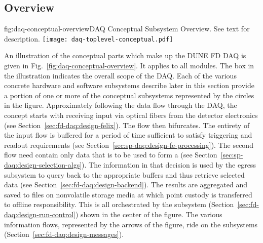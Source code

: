 \subsection{Overview}
\label{sec:fd-daq:design-overview}

\begin{dunefigure}{fig:daq-conceptual-overview}{DAQ Conceptual
    Subsystem Overview.  See text for description.}
  \texttt{[image: daq-toplevel-conceptual.pdf]}
\end{dunefigure}


An illustration of the conceptual parts which make up the DUNE FD DAQ is given in Fig.~\ref{fig:daq-conceptual-overview}. 
It applies to all  modules. 
The box in the illustration indicates the overall scope of the DAQ.
Each of the various concrete hardware and software subsystems describe later in this section provide a portion of one or more of the conceptual subsystems represented by the circles in the figure.
Approximately following the data flow through the DAQ, the concept starts with receiving input via optical fibers from the detector electronics (see Section~\ref{sec:fd-daq:design-felix}). 
The flow then bifurcates. 
The entirety of the input flow is buffered for a period of time sufficient to satisfy triggering and readout requirements (see Section~\ref{sec:sp-daq:design-fe-processing}). 
The second flow need contain only data that is to be used to form a  (see Section~\ref{sec:sp-daq:design-selection-algs}).
The information in that decision is used by the egress subsystem to query back to the appropriate buffers and thus retrieve selected data (see Section~\ref{sec:fd-daq:design-backend}).
The results are aggregated and saved to files on nonvolatile storage media at which point custody is transferred to offline responsibility.
This is all orchestrated by the  subsystem (Section~\ref{sec:fd-daq:design-run-control}) shown in the center of the figure.   The various information flows, represented by the arrows of the figure, ride on the  subsystems (Section~\ref{sec:fd-daq:design-messages}). 

